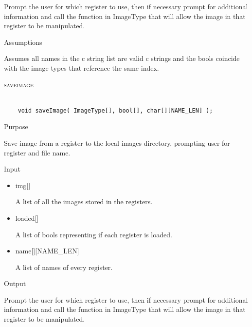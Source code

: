 \documentclass[pdftex, 11pt]{article}
\begin{document}
\begin{description}
\begin{description}
				Prompt the user for which register to use, then if necessary
				prompt for additional information and call the function
				in ImageType that will allow the image in that register to
				be manipulated.

			\item{Assumptions}

				Assumes all names in the c string list are valid c
				strings and the bools coincide with the image types that
				reference the same index.

		\end{description}



	\item{\textsc{saveimage}}

		\begin{lstlisting}

	void saveImage( ImageType[], bool[], char[][NAME_LEN] );
		\end{lstlisting}

		\begin{description}
			\item{Purpose}

				Save image from a register to the local images directory, prompting user for
				register and file name.

			\item{Input}

				\begin{itemize}

					\item{img[]}

						A list of all the images stored in the registers.

					\item{loaded[]}

						A list of bools representing if each register is loaded.

					\item{name[][NAME\_LEN]}

						A list of names of every register.

				\end{itemize}

			\item{Output}

				Prompt the user for which register to use, then if necessary
				prompt for additional information and call the function
				in ImageType that will allow the image in that register to
				be manipulated.


\end{description}
\end{description}
\end{document}
